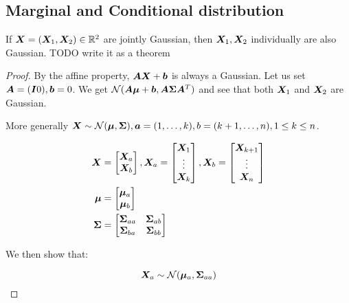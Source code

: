 \begin{tcolorbox}
    \section{Marginal and Conditional distribution}
    
    If ${\bm{X}} = ({\bm{X}}_1, {\bm{X}}_2) \in {\mathbb{R}}^2$ are jointly Gaussian, then ${\bm{X}}_1, {\bm{X}}_2$ individually are also Gaussian. {TODO write it as a theorem}
    
    \begin{proof}
        By the affine property, ${\bm{A}} {\bm{X}} + {\bm{b}}$ is always a Gaussian. Let us set ${\bm{A}} = ({\bm{I}} 0), {\bm{b}} = 0$. We get ${\mathcal{N}}({\bm{A}} {\bm{\mu}} + {\bm{b}}, {\bm{A}} {\bm{\Sigma}} {\bm{A}}^T)$ and see that both ${\bm{X}}_1$ and ${\bm{X}}_2$ are Gaussian.
        
        More generally ${\bm{X}} \sim {\mathcal{N}}({\bm{\mu}}, {\bm{\Sigma}}), {\bm{a}} = (1, \dots, k), b = (k+1, \dots, n), 1 \leq k \leq n$.
        
        \begin{align}
            {\bm{X}} &= \begin{bmatrix} {\bm{X}}_a \\ {\bm{X}}_b \end{bmatrix},
            {\bm{X}}_a = \begin{bmatrix} {\bm{X}}_1 \\ \vdots \\ {\bm{X}}_k \end{bmatrix},
            {\bm{X}}_b = \begin{bmatrix} {\bm{X}}_{k+1} \\ \vdots \\ {\bm{X}}_n \end{bmatrix} \\
            {\bm{\mu}} &= \begin{bmatrix} {\bm{\mu}}_a \\ {\bm{\mu}}_b \end{bmatrix} \\
            {\bm{\Sigma}} &= \begin{bmatrix}
                {\bm{\Sigma}}_{aa} & {\bm{\Sigma}}_{ab} \\
                {\bm{\Sigma}}_{ba} & {\bm{\Sigma}}_{bb}
            \end{bmatrix}
        \end{align}
        
        We then show that:
        
        \begin{equation}
            {\bm{X}}_a \sim {\mathcal{N}}({\bm{\mu}}_a, {\bm{\Sigma}}_{aa})
        \end{equation}
        

\end{proof}
\end{tcolorbox}
